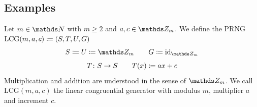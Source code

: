 \documentclass{stdlocal}
\begin{document}
  \subsection{Examples}
    \begin{definition}
      Let $m\in\setNatural$ with $m\geq 2$ and $a,c\in\setInteger_m$.
      We define the PRNG $\mathrm{LCG}(m,a,c) \coloneqq (S,T,U,G)$
      \[
        S \define U \define \setInteger_m
        \separate
        G \define \identity_{\setInteger_m}
      \]
      \[
        T\colon S\to S
        \qquad
        T(x) \coloneqq a x + c
      \]
      Multiplication and addition are understood in the sense of $\setInteger_m$.
      We call $\mathrm{LCG}(m,a,c)$ the linear congruential generator with modulus $m$, multiplier $a$ and increment $c$.
    \end{definition}
\end{document}
